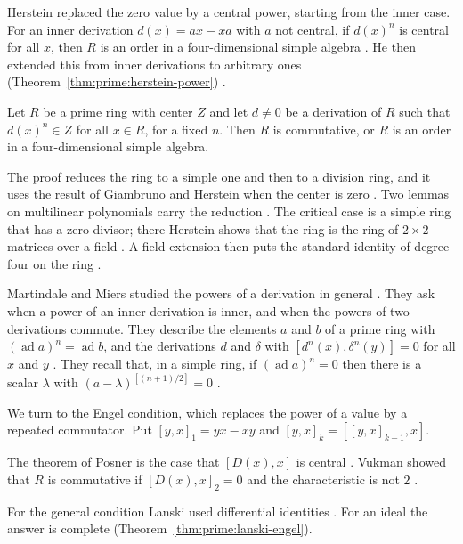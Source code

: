 Herstein replaced the zero value by a central power, starting from the inner
case. For an inner derivation $d(x)=ax-xa$ with $a$ not central, if $d(x)^{n}$ is
central for all $x$, then $R$ is an order in a four-dimensional simple algebra
\cite[p.~163]{Herstein1982Power}. He then extended this from inner derivations to
arbitrary ones (Theorem~\ref{thm:prime:herstein-power}) \cite[p.~163]{Herstein1982Power}.

\begin{theorem}\label{thm:prime:herstein-power}
Let $R$ be a prime ring with center $Z$ and let $d\neq 0$ be a derivation of $R$
such that $d(x)^{n}\in Z$ for all $x\in R$, for a fixed $n$. Then $R$ is
commutative, or $R$ is an order in a four-dimensional simple algebra.
\end{theorem}

The proof reduces the ring to a simple one and then to a division ring, and it
uses the result of Giambruno and Herstein when the center is zero
\cite[p.~163]{Herstein1982Power}. Two lemmas on multilinear polynomials carry the
reduction \cite[Lemmas~1 and~2, p.~163]{Herstein1982Power}. The critical case is a
simple ring that has a zero-divisor; there Herstein shows that the ring is the ring
of $2\times2$ matrices over a field \cite[Theorem~3, p.~169]{Herstein1982Power}. A
field extension then puts the standard identity of degree four on the ring
\cite[p.~170]{Herstein1982Power}.

Martindale and Miers studied the powers of a derivation in general
\cite[p.~179]{MartindaleMiers1983}. They ask when a power of an inner derivation is inner, and when the powers of two derivations commute. They
describe the elements $a$ and $b$ of a prime ring with $(\operatorname{ad}a)^n=\operatorname{ad}b$,
and the derivations $d$ and $\delta$ with $[d^n(x),\delta^n(y)]=0$ for all $x$ and
$y$ \cite[p.~179]{MartindaleMiers1983}. They recall that, in a simple ring, if
$(\operatorname{ad}a)^n=0$ then there is a scalar $\lambda$ with
$(a-\lambda)^{[(n+1)/2]}=0$ \cite[p.~179]{MartindaleMiers1983}.

We turn to the Engel condition, which replaces the power of a value by a repeated
commutator. Put $[y,x]_1=yx-xy$ and $[y,x]_k=[[y,x]_{k-1},x]$.

The theorem of Posner is the case that $[D(x),x]$ is central
\cite[p.~731]{Lanski1993}. Vukman showed that $R$ is commutative if
$[D(x),x]_2=0$ and the characteristic is not $2$ \cite[p.~731]{Lanski1993}.

For the general condition Lanski used differential identities
\cite[p.~731]{Lanski1993}. For an ideal the answer is complete (Theorem~\ref{thm:prime:lanski-engel}).

